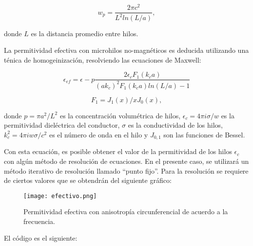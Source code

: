 \documentclass[12pt,letterpaper]{article}
\numberwithin{equation}{section}
\begin{document}
\begin{equation}
w_{p}=\frac{2 \pi c^2}{L^2 ln(L/a)},
\end{equation}

\noindent donde $L$ es la distancia promedio entre hilos.

La permitividad efectiva con microhilos no-magnéticos es deducida utilizando una ténica de homogeinización, resolviendo las ecuaciones de Maxwell:

\begin{equation}
\epsilon_{ef}=\epsilon -p \frac{2\epsilon_{c} F_{1} (k_{c}a)}{(ak_{c})^2F_{1}(k_{c}a) ln(L/a)-1}
\end{equation}

\begin{equation}
F_{1} =J_{1}(x)/xJ_{0}(x),
\end{equation}

\noindent donde $p=\pi a^2 / L^2$ es la concentración volumétrica de hilos, $\epsilon_{c} = 4 \pi i \sigma /w$ es la permitividad dieléctrica del conductor, $\sigma$ es la conductividad de los hilos, $k_{c}^2 = 4 \pi i w \sigma /c^2$ es el número de onda en el hilo y $J_{0,1}$ son las funciones de Bessel. \cite{Wire_theory_2}

Con esta ecuación, es posible obtener el valor de la permitividad de los hilos $\epsilon_{c}$ con algún método de resolución de ecuaciones. En el presente caso, se utilizará un método iterativo de resolución llamado ``punto fijo''. Para la resolución se requiere de ciertos valores que se obtendrán del siguiente gráfico:

\begin{figure}[H]
	\centering\texttt{[image: efectivo.png]}\\
	\caption{Permitividad efectiva con anisotropía circunferencial de acuerdo a la frecuencia.}
	\label{fig:efectivo}
\end{figure} 

El código es el siguiente:
\end{document}

